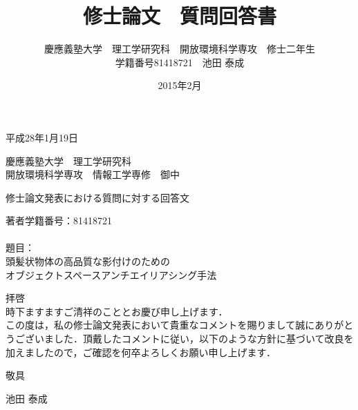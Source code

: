 \documentclass[a4j,10pt]{jsarticle}
\title{修士論文　質問回答書}
\author{慶應義塾大学　理工学研究科　開放環境科学専攻　修士二年生\\学籍番号81418721　池田 泰成}
\date{2015年2月}
\begin{document}
\begin{flushright}
平成28年1月19日
\end{flushright}


\noindent
慶應義塾大学　理工学研究科\\
開放環境科学専攻　情報工学専修　御中

\vspace{3cm}
\begin{center}
{\Huge 修士論文発表における質問に対する回答文}
\end{center}

\vspace{3cm}
\noindent
{\Large 著者学籍番号：81418721\\
\\
題目：\\
頭髪状物体の高品質な影付けのための\\オブジェクトスペースアンチエイリアシング手法\\}

\vspace{3cm}
\noindent
{\Large 拝啓\\
時下ますますご清祥のこととお慶び申し上げます．\\
この度は，私の修士論文発表において貴重なコメントを賜りまして誠にありがとうございました．頂戴したコメントに従い，以下のような方針に基づいて改良を加えましたので，ご確認を何卒よろしくお願い申し上げます．\\}


\begin{flushright}
{\Large 敬具




池田 泰成}
\end{flushright}
\end{document}

